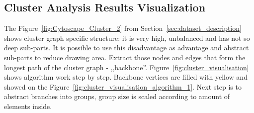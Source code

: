\subsection{Cluster Analysis Results Visualization}
\label{sec:cluster}

The Figure~\ref{fig:Cytoscape_Cluster_2} from Section~\ref{sec:dataset_description} shows cluster graph specific structure: it is very high, unbalanced and has not so deep sub-parts. It is possible to use this disadvantage as advantage and abstract sub-parts to reduce drawing area. Extract those nodes and edges that form the longest path of the cluster graph - ,,backbone''. Figure~\ref{fig:cluster_visualisation} shows algorithm work step by step. Backbone vertices are filled with yellow and showed on the Figure~\ref{fig:cluster_visualisation_algorithm_1}. Next step is to abstract branches into groups, group size is scaled according to amount of elements inside.

